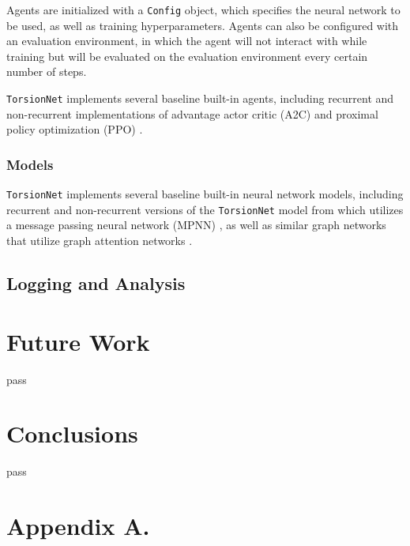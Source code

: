 \documentclass[twoside,11pt]{article}
\newcommand{\code}[1]{\texttt{#1}}
\begin{document}
  Agents are initialized with a \code{Config} object, which specifies the neural network to be used, as well as training hyperparameters. Agents can also be configured with an evaluation environment, in which the agent will not interact with while training but will be evaluated on the evaluation environment every certain number of steps.

  \code{TorsionNet} implements several baseline built-in agents, including recurrent and non-recurrent implementations of advantage actor critic (A2C) \citep{wu2017a2c} and proximal policy optimization (PPO) \citep{schulman2017ppo}.

  \subsubsection{Models}
    \code{TorsionNet} implements several baseline built-in neural network models, including recurrent and non-recurrent versions of the \code{TorsionNet} model from \citep{gogineni2020torsionnet} which utilizes a message passing neural network (MPNN) \citep{gilmer2017mpnn}, as well as similar graph networks that utilize graph attention networks \citep{gatnn}.


\subsection{Logging and Analysis}

\section{Future Work}
pass
\section{Conclusions}
pass





\vskip 0.2in




\newpage

\appendix
\section*{Appendix A.}
\end{document}
